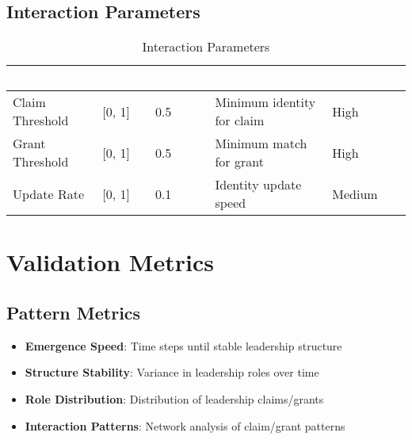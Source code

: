 \documentclass[12pt]{article}
\begin{document}
\subsection{Interaction Parameters}
\begin{table}[H]
\begin{tabular}{L{3cm}|L{2cm}|L{3cm}|L{4cm}|L{3cm}}
\textcolor{white}{\textbf{Parameter}} & \textcolor{white}{\textbf{Range}} & \textcolor{white}{\textbf{Default}} & \textcolor{white}{\textbf{Description}} & \textcolor{white}{\textbf{Sensitivity}} \\
\hline
Claim Threshold & [0, 1] & 0.5 & Minimum identity for claim & High \\
Grant Threshold & [0, 1] & 0.5 & Minimum match for grant & High \\
Update Rate & [0, 1] & 0.1 & Identity update speed & Medium \\
\end{tabular}
\caption{Interaction Parameters}
\end{table}

\section{Validation Metrics}

\subsection{Pattern Metrics}
\begin{itemize}
\item \textbf{Emergence Speed}: Time steps until stable leadership structure
\item \textbf{Structure Stability}: Variance in leadership roles over time
\item \textbf{Role Distribution}: Distribution of leadership claims/grants
\item \textbf{Interaction Patterns}: Network analysis of claim/grant patterns
\end{itemize}
\end{document}
